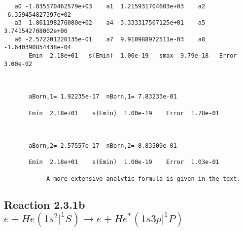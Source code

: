 \documentclass[12pt]{article}
\begin{document}
%










\begin{small}\begin{verbatim}
   a0 -1.035570462579e+03    a1  1.215931704603e+03    a2 -6.359454827397e+02
   a3  1.861198276080e+02    a4 -3.333317507125e+01    a5  3.741542708002e+00
   a6 -2.572201220135e-01    a7  9.910988972511e-03    a8 -1.640390854438e-04
       Emin  2.18e+01   s(Emin)  1.00e-19   smax  9.79e-18   Error  3.00e-02



       aBorn,1= 1.92235e-17  nBorn,1= 7.83233e-01

       Emin  2.18e+01    s(Emin)  1.00e-19    Error  1.78e-01



       aBorn,2= 2.57557e-17  nBorn,2= 8.83509e-01

       Emin  2.18e+01    s(Emin)  1.00e-19    Error  1.03e-01

            A more extensive analytic formula is given in the text.
\end{verbatim}\end{small}




\newpage
\subsection{
Reaction 2.3.1b $e + He(1s^2|^1S) \rightarrow e + He^*(1s3p|^1P)$}






\end{document}
